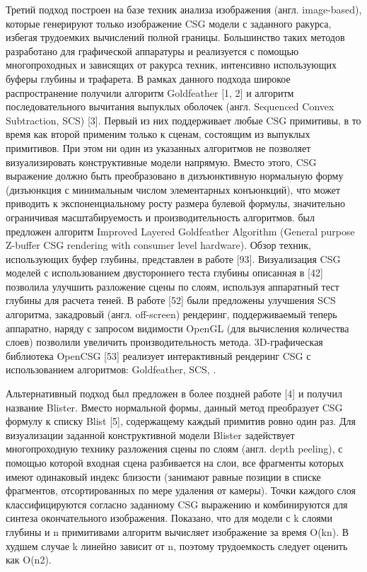 {{{{Третий подход построен на базе техник анализа изображения (англ. image-based), которые генерируют только изображение CSG модели с заданного ракурса, избегая трудоемких вычислений полной границы. Большинство таких методов разработано для графической аппаратуры и реализуется с помощью многопроходных и зависящих от ракурса техник, интенсивно использующих буферы глубины и трафарета. В рамках данного подхода широкое распространение получили алгоритм Goldfeather [1, 2] и алгоритм последовательного вычитания выпуклых оболочек (англ. Sequenced Convex Subtraction, SCS) [3]. Первый из них поддерживает любые CSG примитивы, в то время как второй применим только к сценам, состоящим из выпуклых примитивов. При этом ни один из указанных  алгоритмов не позволяет визуализировать конструктивные модели напрямую. Вместо этого, CSG выражение должно быть преобразовано в дизъюнктивную нормальную форму (дизъюнкция с минимальным числом элементарных конъюнкций), что может приводить к экспоненциальному росту размера булевой формулы, значительно ограничивая  масштабируемость и производительность алгоритмов.  был предложен алгоритм Improved Layered Goldfeather Algorithm (General purpose Z-buffer CSG rendering with consumer level hardware). Обзор техник, использующих буфер глубины, представлен в работе [93]. Визуализация CSG моделей с использованием двустороннего теста глубины описанная в [42] позволила улучшить разложение сцены по слоям, используя аппаратный тест глубины для расчета теней. В работе [52] были предложены улучшения SCS алгоритма, закадровый (англ. off-screen) рендеринг, поддерживаемый теперь аппаратно, наряду с запросом видимости OpenGL (для вычисления количества слоев) позволили увеличить производительность метода. 3D-графическая библиотека OpenCSG [53] реализует интерактивный рендеринг CSG с использованием алгоритмов: Goldfeather, SCS, . 

Альтернативный подход был предложен в более поздней работе [4] и получил название Blister. Вместо нормальной формы, данный метод преобразует CSG формулу к списку Blist [5], содержащему каждый примитив ровно один раз. Для визуализации заданной конструктивной модели Blister задействует многопроходную технику разложения сцены по слоям (англ. depth peeling), с помощью которой входная сцена разбивается на слои, все фрагменты которых имеют одинаковый индекс близости (занимают равные позиции в списке фрагментов, отсортированных по мере удаления от камеры). Точки каждого слоя классифицируются согласно заданному CSG выражению и комбинируются для синтеза окончательного изображения. Показано, что для модели с k слоями глубины и n примитивами алгоритм вычисляет изображение за время O(kn). В худшем случае k линейно зависит от n, поэтому трудоемкость следует оценить как O(n2).

}}}}
